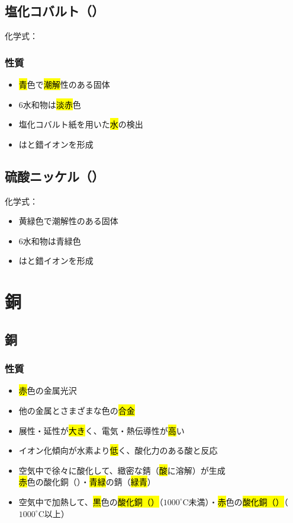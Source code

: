  \subsection{塩化コバルト（）}
 化学式：\hl{}
 \subsubsection{性質}
 \begin{itemize}
  \item \hl{青}色で\hl{潮解}性のある固体
  \item 6水和物は\hl{淡赤}色
  \item 塩化コバルト紙を用いた\hl{水}の検出
  \item {}は\hl{}と錯イオンを形成
 \end{itemize}
 \subsection{硫酸ニッケル（）}
 化学式：\hl{}
 \begin{itemize}
  \item 黄緑色で潮解性のある固体
  \item 6水和物は青緑色
  \item {}は\hl{}と錯イオンを形成
 \end{itemize}
 \section{銅}
 \subsection{銅}
 \subsubsection{性質}
 \begin{itemize}
  \item \hl{赤}色の金属光沢
  \item 他の金属とさまざまな色の\hl{合金}
  \item 展性・延性が\hl{大き}く、電気・熱伝導性が\hl{高}い
  \item イオン化傾向が水素より\hl{低}く、酸化力のある酸と反応\\
  \item 空気中で徐々に酸化して、緻密な錆（\hl{酸}に溶解）が生成\\
  \hl{赤}色の酸化銅（）・\hl{青緑}の錆（\hl{緑青}）
  \item 空気中で加熱して、\hl{黒}色の\hl{酸化銅（）}（$1000^\circ$C未満）・\hl{赤}色の\hl{酸化銅（）}（$1000^\circ$C以上）
 \end{itemize}
